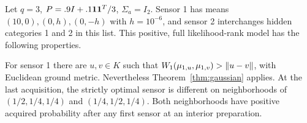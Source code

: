 \begin{proposition}\label{prop:expansive}
Let $q=3$, $P=.9I+.1\mathbf 1\mathbf 1^T/3$, $\Sigma_a=I_2$. Sensor 1 has means $(10,0),(0,h),(0,-h)$ with $h=10^{-6}$, and sensor 2 interchanges hidden categories 1 and 2 in this list. This positive, full likelihood-rank model has the following properties.

For sensor 1 there are $u,v\in K$ such that
$W_1(\mu_{1,u},\mu_{1,v})>\left\lVert u-v\right\rVert$, with Euclidean ground metric. Nevertheless Theorem~\ref{thm:gaussian} applies. At the last acquisition, the strictly optimal sensor is different on neighborhoods of $(1/2,1/4,1/4)$ and $(1/4,1/2,1/4)$. Both neighborhoods have positive acquired probability after any first sensor at an interior preparation.
\end{proposition}
